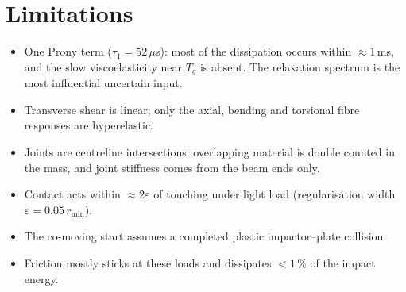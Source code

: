 \documentclass[11pt,a4paper]{article}
\begin{document}
\section{Limitations}
\label{sec:limits}
\begin{itemize}
\item One Prony term ($\tau_1 = 52\,\mu$s): most of the dissipation occurs within $\approx 1$\,ms, and the slow
viscoelasticity near $T_g$ is absent. The relaxation spectrum is the most influential uncertain input.
\item Transverse shear is linear; only the axial, bending and torsional fibre responses are hyperelastic.
\item Joints are centreline intersections: overlapping material is double counted in the mass, and joint
stiffness comes from the beam ends only.
\item Contact acts within $\approx2\varepsilon$ of touching under light load (regularisation width
$\varepsilon = 0.05\,r_{\min}$).
\item The co-moving start assumes a completed plastic impactor--plate collision.
\item Friction mostly sticks at these loads and dissipates $<1$\,\% of the impact energy.
\end{itemize}
\end{document}
